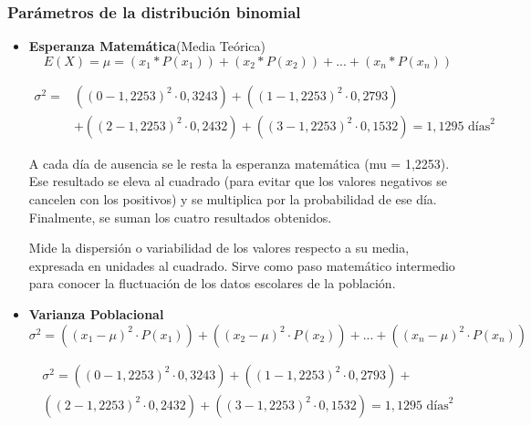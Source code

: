 \subsubsection{Parámetros de la distribución binomial}
\begin{itemize}
\item \textbf{Esperanza Matemática}(Media Teórica) \\
  \[ E(X) = \mu = (x_1 * P(x_1)) + (x_2 * P(x_2)) + ... + (x_n * P(x_n)) \]

  \begin{equation*}
    \begin{split}
      \sigma^2 = {} & ((0 - 1{,}2253)^2 \cdot 0{,}3243) + ((1 - 1{,}2253)^2 \cdot 0{,}2793) \\
                    & + ((2 - 1{,}2253)^2 \cdot 0{,}2432) + ((3 - 1{,}2253)^2 \cdot 0{,}1532) =
                    1{,}1295 \text{ días}^2
    \end{split}
  \end{equation*}

  A cada día de ausencia se le resta la esperanza matemática (mu = 1,2253). Ese resultado se eleva al
  cuadrado (para evitar que los valores negativos se cancelen con los positivos) y se multiplica por
  la probabilidad de ese día. Finalmente, se suman los cuatro resultados obtenidos.

   Mide la dispersión o variabilidad de los valores respecto a su media,
  expresada en unidades al cuadrado. Sirve como paso matemático intermedio para conocer la fluctuación
  de los datos escolares de la población.

\item \textbf{Varianza Poblacional} \\
  \begin{equation*}
    \sigma^2 = ((x_1 - \mu)^2 \cdot P(x_1)) + ((x_2 - \mu)^2 \cdot P(x_2)) + ... + ((x_n - \mu)^2 \cdot P(x_n))
  \end{equation*}

  \begin{equation*}
    \begin{split}
      \sigma^2 = ((0 - 1{,}2253)^2 \cdot 0{,}3243) + ((1 - 1{,}2253)^2 \cdot 0{,}2793) + \\
      ((2 - 1{,}2253)^2 \cdot 0{,}2432) + ((3 - 1{,}2253)^2 \cdot 0{,}1532) = 1{,}1295 \text{ días}^2
    \end{split}
  \end{equation*}


\end{itemize}
